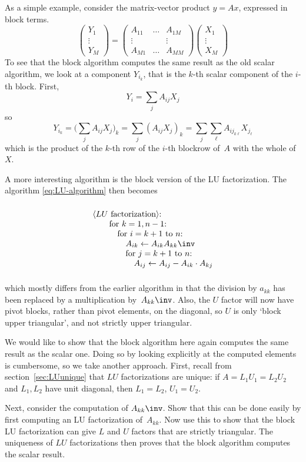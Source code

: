 As a simple example, consider the matrix-vector product $y=Ax$, expressed in
block terms.
\[ 
\begin{pmatrix}
  Y_1\\ \vdots\\ Y_M
\end{pmatrix}=
\begin{pmatrix}
  A_{11}&\ldots&A_{1M}\\ \vdots&&\vdots\\ A_{M1}&\ldots&A_{MM}
\end{pmatrix}
\begin{pmatrix}
  X_1\\ \vdots\\ X_M
\end{pmatrix}
\]
To see that the block algorithm computes the same result as the old
scalar algorithm, we look at a component $Y_{i_k}$, that is the $k$-th
scalar component of the $i$-th block. First,
\[ Y_i=\sum_j A_{ij}X_j \]
so 
\[
  Y_{i_k}=\bigl(\sum_j A_{ij}X_j\bigr)_k=
  \sum_j \left(A_{ij}X_j\right)_k=\sum_j\sum_\ell A_{ij_{k\ell}}X_{j_\ell}
\]
which is the product of the $k$-th row of the $i$-th blockrow of~$A$
with the whole of~$X$.

A more interesting algorithm is the block version of the LU
factorization. The algorithm \eqref{eq:LU-algorithm} then becomes
\begin{equation}
 \vcenter{%
\begin{tabbing}
  \kern20pt\=\kern10pt\=\kern10pt\=\kern10pt\=\kill
  \macro{$LU$ factorization}:\\
  \>for $k=1,n-1$:\\
  \>\>for $i=k+1$ to $n$:\\
  \>\>\> $A_{ik}\leftarrow A_{ik}A_{kk}\inv$\\
  \>\>\>for $j=k+1$ to $n$:\\
  \>\>\>\>$A_{ij}\leftarrow A_{ij}-A_{ik}\cdot A_{kj}$
\end{tabbing}
  }
\label{eq:LU-block-algorithm}
\end{equation}
which mostly differs from the earlier algorithm in that the division
by $a_{kk}$ has been replaced by a multiplication
by~$A_{kk}\inv$. Also, the $U$ factor will now have pivot blocks,
rather than pivot elements, on the diagonal, so $U$ is only `block
upper triangular', and not strictly upper triangular.

\begin{exercise}
  We would like to show that the block algorithm here again computes
  the same result as the scalar one. Doing so by looking explicitly at
  the computed elements is cumbersome, so we take another
  approach.  First, recall from section~\ref{sec:LUunique} that $LU$ factorizations are unique: if
  $A=L_1U_1=L_2U_2$ and $L_1,L_2$ have unit diagonal, then $L_1=L_2$,
  $U_1=U_2$.

  Next, consider the computation of $A_{kk}\inv$. Show that this can
  be done easily by first computing an LU factorization
  of~$A_{kk}$. Now use this to show that the block LU factorization
  can give $L$ and $U$ factors that are strictly triangular. The
  uniqueness of $LU$ factorizations then proves that the block
  algorithm computes the scalar result.
\end{exercise}

